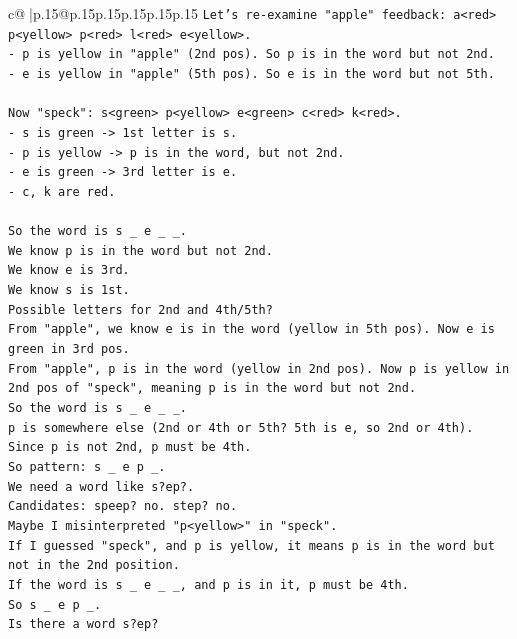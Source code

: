 \documentclass{article}
\begin{document}
{\begin{supertabular}{c@{$\;$}|p{.15\linewidth}@{}p{.15\linewidth}p{.15\linewidth}p{.15\linewidth}p{.15\linewidth}p{.15\linewidth}}
{{{\texttt{Let's re{-}examine "apple" feedback: a<red> p<yellow> p<red> l<red> e<yellow>.} \\
\texttt{{-} p is yellow in "apple" (2nd pos). So p is in the word but not 2nd.} \\
\texttt{{-} e is yellow in "apple" (5th pos). So e is in the word but not 5th.} \\
\\ 
\texttt{Now "speck": s<green> p<yellow> e<green> c<red> k<red>.} \\
\texttt{{-} s is green {-}> 1st letter is s.} \\
\texttt{{-} p is yellow {-}> p is in the word, but not 2nd.} \\
\texttt{{-} e is green {-}> 3rd letter is e.} \\
\texttt{{-} c, k are red.} \\
\\ 
\texttt{So the word is s \_ e \_ \_.} \\
\texttt{We know p is in the word but not 2nd.} \\
\texttt{We know e is 3rd.} \\
\texttt{We know s is 1st.} \\
\texttt{Possible letters for 2nd and 4th/5th?} \\
\texttt{From "apple", we know e is in the word (yellow in 5th pos). Now e is green in 3rd pos.} \\
\texttt{From "apple", p is in the word (yellow in 2nd pos). Now p is yellow in 2nd pos of "speck", meaning p is in the word but not 2nd.} \\
\texttt{So the word is s \_ e \_ \_.} \\
\texttt{p is somewhere else (2nd or 4th or 5th? 5th is e, so 2nd or 4th). Since p is not 2nd, p must be 4th.} \\
\texttt{So pattern: s \_ e p \_.} \\
\texttt{We need a word like s?ep?.} \\
\texttt{Candidates: speep? no. step? no.} \\
\texttt{Maybe I misinterpreted "p<yellow>" in "speck".} \\
\texttt{If I guessed "speck", and p is yellow, it means p is in the word but not in the 2nd position.} \\
\texttt{If the word is s \_ e \_ \_, and p is in it, p must be 4th.} \\
\texttt{So s \_ e p \_.} \\
\texttt{Is there a word s?ep?} \\
}}}
\end{supertabular}}
\end{document}
